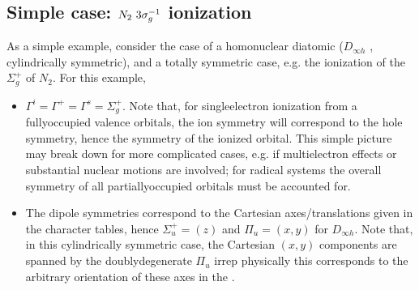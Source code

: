 \documentclass[letterpaper,table,10pt,english]{jupyterBook}
\begin{document}
\subsection{Simple case: \protect\(N_2~3\sigma_g^{-1}\protect\) ionization}
\label{\detokenize{part2/sym-fitting-intro_220423:simple-case-n-2-3-sigma-g-1-ionization}}
\sphinxAtStartPar
As a simple example, consider the case of a homonuclear diatomic (\(D_{\infty h}\) {\hyperref[\detokenize{backmatter/glossary:term-PG}]{}}, cylindrically symmetric), and a totally symmetric case, e.g. the ionization of the \(\Sigma_{g}^{+}\) {\hyperref[\detokenize{backmatter/glossary:term-HOMO}]{}} of \(N_2\). For this example,
\begin{itemize}
\item {} 
\sphinxAtStartPar
\(\Gamma^{i} = \Gamma^{+} = \Gamma^{s} = \Sigma_{g}^{+}\). Note that, for single\sphinxhyphen{}electron ionization from a fully\sphinxhyphen{}occupied valence orbitals, the ion symmetry will correspond to the hole symmetry, hence the symmetry of the ionized orbital. This simple picture may break down for more complicated cases, e.g. if multi\sphinxhyphen{}electron effects or substantial nuclear motions are involved; for radical systems the overall symmetry of all partially\sphinxhyphen{}occupied orbitals must be accounted for.

\item {} 
\sphinxAtStartPar
The dipole symmetries correspond to the Cartesian axes/translations given in the character tables, hence \(\Sigma_{u}^{+} = (z)\) and \(\Pi_{u} = (x,y)\) for \(D_{\infty h}\). Note that, in this cylindrically symmetric case, the Cartesian \((x,y)\) components are spanned by the doubly\sphinxhyphen{}degenerate \(\Pi_{u}\) irrep \sphinxhyphen{} physically this corresponds to the arbitrary orientation of these axes in the {\hyperref[\detokenize{backmatter/glossary:term-MF}]{}}.

\end{itemize}
\end{document}

